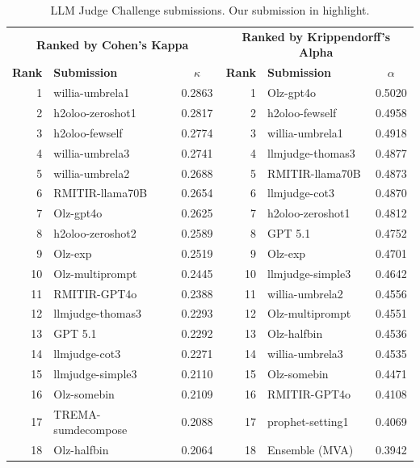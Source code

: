 \begin{table}[h]
\centering
\small
\caption{LLM Judge Challenge submissions. Our submission in highlight.}
\label{tab:judge-challenge-rankings}
\begin{tabular}{rlc|rlc}
\toprule
\multicolumn{3}{c|}{\textbf{Ranked by Cohen's Kappa}} & \multicolumn{3}{c}{\textbf{Ranked by Krippendorff's Alpha}} \\
\textbf{Rank} & \textbf{Submission} & \textbf{$\kappa$} & \textbf{Rank} & \textbf{Submission} & \textbf{$\alpha$} \\
\midrule
1 & willia-umbrela1 & 0.2863 & 1 & Olz-gpt4o & 0.5020 \\
2 & h2oloo-zeroshot1 & 0.2817 & 2 & h2oloo-fewself & 0.4958 \\
3 & h2oloo-fewself & 0.2774 & 3 & willia-umbrela1 & 0.4918 \\
4 & willia-umbrela3 & 0.2741 & 4 & llmjudge-thomas3 & 0.4877 \\
5 & willia-umbrela2 & 0.2688 & 5 & RMITIR-llama70B & 0.4873 \\
6 & RMITIR-llama70B & 0.2654 & 6 & llmjudge-cot3 & 0.4870 \\
7 & Olz-gpt4o & 0.2625 & 7 & h2oloo-zeroshot1 & 0.4812 \\
8 & h2oloo-zeroshot2 & 0.2589 & \cellcolor{bhtVeryLightGray}8 & \cellcolor{bhtVeryLightGray}GPT 5.1 & \cellcolor{bhtVeryLightGray}0.4752 \\
9 & Olz-exp & 0.2519 & 9 & Olz-exp & 0.4701 \\
10 & Olz-multiprompt & 0.2445 & 10 & llmjudge-simple3 & 0.4642 \\
11 & RMITIR-GPT4o & 0.2388 & 11 & willia-umbrela2 & 0.4556 \\
12 & llmjudge-thomas3 & 0.2293 & 12 & Olz-multiprompt & 0.4551 \\
\cellcolor{bhtVeryLightGray}13 & \cellcolor{bhtVeryLightGray}GPT 5.1 & \cellcolor{bhtVeryLightGray}0.2292 & 13 & Olz-halfbin & 0.4536 \\
14 & llmjudge-cot3 & 0.2271 & 14 & willia-umbrela3 & 0.4535 \\
15 & llmjudge-simple3 & 0.2110 & 15 & Olz-somebin & 0.4471 \\
16 & Olz-somebin & 0.2109 & 16 & RMITIR-GPT4o & 0.4108 \\
17 & TREMA-sumdecompose & 0.2088 & 17 & prophet-setting1 & 0.4069 \\
18 & Olz-halfbin & 0.2064 & \cellcolor{bhtVeryLightGray}18 & \cellcolor{bhtVeryLightGray}Ensemble (MVA) & \cellcolor{bhtVeryLightGray}0.3942 \\

\end{tabular}
\end{table}
